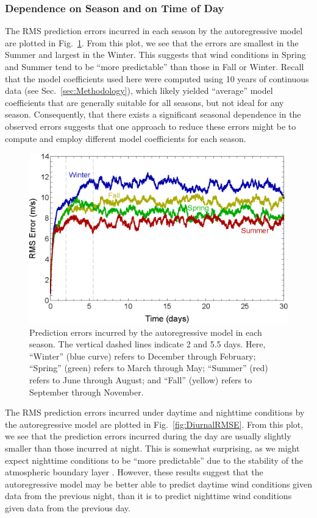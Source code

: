\documentclass[11pt, oneside]{article}
\newcommand{\figref}[1]{Fig.~\ref{#1}}
\newcommand{\secref}[1]{Sec.~\ref{#1}}
\begin{document}
\subsubsection{Dependence on Season and on Time of Day}
The RMS prediction errors incurred in each season by the autoregressive model are plotted in \figref{fig:SeasonalRMSE}.
From this plot, we see that the errors are smallest in the Summer and largest in the Winter.
This suggests that wind conditions in Spring and Summer tend to be ``more predictable'' than those in Fall or Winter.
Recall that the model coefficients used here were computed using 10 years of continuous data (see 
\secref{sec:Methodology}), which likely yielded ``average'' model coefficients that are generally suitable for all seasons, but not ideal for any season.
Consequently, that there exists a significant seasonal dependence in the observed errors suggests that one approach to reduce these errors might be to compute and employ different model coefficients for each season.

\begin{figure}[htb]
\centering
\includegraphics[width=0.7\columnwidth]{figures/SeasonalRMSPredictionError}
\caption{Prediction errors incurred by the autoregressive model in each season.
The vertical dashed lines indicate 2 and 5.5 days.
Here, ``Winter'' (blue curve) refers to December through February;
``Spring'' (green) refers to March through May;
``Summer'' (red) refers to June through August; and
``Fall'' (yellow) refers to September through November.}
\label{fig:SeasonalRMSE}
\end{figure}

The RMS prediction errors incurred under daytime and nighttime conditions by the autoregressive model are plotted in \figref{fig:DiurnalRMSE}.
From this plot, we see that the prediction errors incurred during the day are usually slightly smaller than those incurred at night.
This is somewhat surprising, as we might expect nighttime conditions to be ``more predictable'' due to the stability of the atmospheric boundary layer \citep[Fig.~1.7]{Stull1988}.
However, these results suggest that the autoregressive model may be better able to predict daytime wind conditions given data from the previous night, than it is to predict nighttime wind conditions given data from the previous day.
\end{document}
